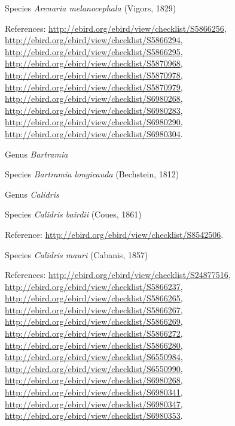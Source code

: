 \documentclass[9pt, article]{memoir}
\begin{document}
\begin{multicols}{2}
\vspace{6pt}\noindent\hspace{36pt}Species \textit{Arenaria melanocephala} (Vigors, 1829)


\vspace{6pt}References: 
\url{http://ebird.org/ebird/view/checklist/S5866256}, 
\url{http://ebird.org/ebird/view/checklist/S5866294}, 
\url{http://ebird.org/ebird/view/checklist/S5866295}, 
\url{http://ebird.org/ebird/view/checklist/S5870968}, 
\url{http://ebird.org/ebird/view/checklist/S5870978}, 
\url{http://ebird.org/ebird/view/checklist/S5870979}, 
\url{http://ebird.org/ebird/view/checklist/S6980268}, 
\url{http://ebird.org/ebird/view/checklist/S6980283}, 
\url{http://ebird.org/ebird/view/checklist/S6980290}, 
\url{http://ebird.org/ebird/view/checklist/S6980304}.

\vspace{6pt}\noindent\hspace{30pt}Genus \textit{Bartramia}


\vspace{6pt}\noindent\hspace{36pt}Species \textit{Bartramia longicauda} (Bechstein, 1812)


\vspace{6pt}\noindent\hspace{30pt}Genus \textit{Calidris}


\vspace{6pt}\noindent\hspace{36pt}Species \textit{Calidris bairdii} (Coues, 1861)


\vspace{6pt}Reference: 
\url{http://ebird.org/ebird/view/checklist/S8542506}.

\vspace{6pt}\noindent\hspace{36pt}Species \textit{Calidris mauri} (Cabanis, 1857)


\vspace{6pt}References: 
\url{http://ebird.org/ebird/view/checklist/S24877516}, 
\url{http://ebird.org/ebird/view/checklist/S5866237}, 
\url{http://ebird.org/ebird/view/checklist/S5866265}, 
\url{http://ebird.org/ebird/view/checklist/S5866267}, 
\url{http://ebird.org/ebird/view/checklist/S5866269}, 
\url{http://ebird.org/ebird/view/checklist/S5866272}, 
\url{http://ebird.org/ebird/view/checklist/S5866280}, 
\url{http://ebird.org/ebird/view/checklist/S6550984}, 
\url{http://ebird.org/ebird/view/checklist/S6550990}, 
\url{http://ebird.org/ebird/view/checklist/S6980268}, 
\url{http://ebird.org/ebird/view/checklist/S6980341}, 
\url{http://ebird.org/ebird/view/checklist/S6980347}, 
\url{http://ebird.org/ebird/view/checklist/S6980353}.


\end{multicols}
\end{document}
